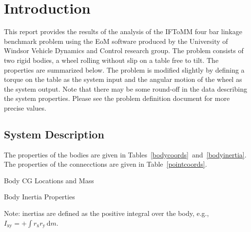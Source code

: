 \chapter{Introduction}
This report provides the results of the analysis of the IFToMM four bar linkage benchmark problem using the EoM software produced by the University of Windsor Vehicle Dynamics and Control research group.  The problem consists of two rigid bodies, a wheel rolling without slip on a table free to tilt.  The properties are summarized below.  The problem is modified slightly by defining a torque on the table as the system input and the angular motion of the wheel as the system output.  Note that there may be some round-off in the data describing the system properties.  Please see the problem definition document for more precise values.

\section{System Description}
The properties of the bodies are given in Tables~\ref{bodycoords}~and~\ref{bodyinertia}.
The properties of the connecctions are given in Table~\ref{pointcoords}.
\begin{table}[ht]
\begin{center}
\begin{threeparttable}
\begin{footnotesize}
\caption{Body CG Locations and Mass}
\label{bodycoords}
\end{footnotesize}
\end{threeparttable}
\end{center}
\end{table}
\begin{table}[ht]
\begin{center}
\begin{threeparttable}
\begin{footnotesize}
\caption{Body Inertia Properties}
\label{bodyinertia}
\begin{tablenotes}
\item Note: inertias are defined as the positive integral over the body, e.g., $I_{\textrm{xy}}=+\! \int \! r_{\textrm{x}}r_{\textrm{y}} \,\text{d}m $.
\end{tablenotes}
\end{footnotesize}
\end{threeparttable}
\end{center}
\end{table}
